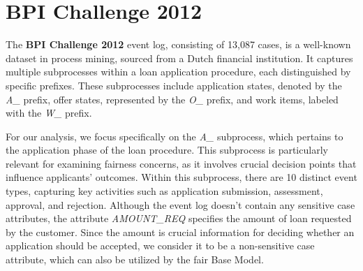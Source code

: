 
\section{BPI Challenge 2012}
\label{sec:bpi_2012}
The \textbf{BPI Challenge 2012} \cite{bpi_2012} event log, consisting of 13,087 cases, is a well-known dataset in process mining,
sourced from a Dutch financial institution.
It captures multiple subprocesses within a loan application procedure, each distinguished by specific prefixes.
These subprocesses include application states, denoted by the \textit{A\_} prefix, offer states, represented by the \textit{O\_} prefix,
and work items, labeled with the \textit{W\_} prefix.

For our analysis, we focus specifically on the \textit{A\_} subprocess, which pertains to the application phase of the loan procedure.
This subprocess is particularly relevant for examining fairness concerns,
as it involves crucial decision points that influence applicants' outcomes.
Within this subprocess, there are 10 distinct event types,
capturing key activities such as application submission, assessment, approval, and rejection.
Although the event log doesn't contain any sensitive case attributes,
the attribute \textit{AMOUNT\_REQ} specifies the amount of loan requested by the customer.
Since the amount is crucial information for deciding whether an application should be accepted,
we consider it to be a non-sensitive case attribute, which can also be utilized by the fair Base Model.

